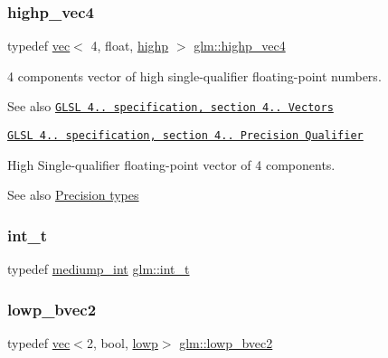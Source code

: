 \subsubsection{\texorpdfstring{highp\+\_\+vec4}{highp\_vec4}}
{\footnotesize\ttfamily typedef \hyperlink{structglm_1_1vec}{vec}$<$ 4, float, \hyperlink{namespaceglm_a36ed105b07c7746804d7fdc7cc90ff25ac6f7eab42eacbb10d59a58e95e362074}{highp} $>$ \hyperlink{group__core__precision_ga27638826fa491205403b39198c49e9f5}{glm\+::highp\+\_\+vec4}}

4 components vector of high single-\/qualifier floating-\/point numbers.

\begin{DoxySeeAlso}{See also}
\href{http://www.opengl.org/registry/doc/GLSLangSpec.4.20.8.pdf}{\tt G\+L\+SL 4.. specification, section 4.. Vectors} 

\href{http://www.opengl.org/registry/doc/GLSLangSpec.4.20.8.pdf}{\tt G\+L\+SL 4.. specification, section 4.. Precision Qualifier}
\end{DoxySeeAlso}
High Single-\/qualifier floating-\/point vector of 4 components. \begin{DoxySeeAlso}{See also}
\hyperlink{group__core__precision}{Precision types} 
\end{DoxySeeAlso}
\mbox{\label{group__core__precision_gacd01d170508f812968875b0f2e730e8c}} 
\subsubsection{\texorpdfstring{int\+\_\+t}{int\_t}}
{\footnotesize\ttfamily typedef \hyperlink{group__core__precision_ga2a3dcbcd7f4e17663d393a12061ac6ac}{mediump\+\_\+int} \hyperlink{group__core__precision_gacd01d170508f812968875b0f2e730e8c}{glm\+::int\+\_\+t}}

\mbox{\label{group__core__precision_ga5529a08a5bb9e851a582f7c4cfa74ba0}} 
\subsubsection{\texorpdfstring{lowp\+\_\+bvec2}{lowp\_bvec2}}
{\footnotesize\ttfamily typedef \hyperlink{structglm_1_1vec}{vec}$<$2, bool, \hyperlink{namespaceglm_a36ed105b07c7746804d7fdc7cc90ff25ae161af3fc695e696ce3bf69f7332bc2d}{lowp}$>$ \hyperlink{group__core__precision_ga5529a08a5bb9e851a582f7c4cfa74ba0}{glm\+::lowp\+\_\+bvec2}}

